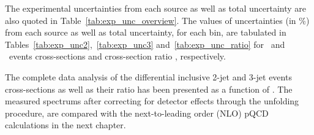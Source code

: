 The experimental uncertainties from each source as well as total uncertainty are also quoted in Table~\ref{tab:exp_unc_overview}. The values of uncertainties (in \%) from each source as well as total uncertainty, for each \httwo bin, are tabulated in Tables~\ref{tab:exp_unc2},~\ref{tab:exp_unc3} and~\ref{tab:exp_unc_ratio} for \njt~and \njth~events cross-sections and cross-section ratio \rations, respectively. 

The complete data analysis of the differential inclusive 2-jet and 3-jet events cross-sections as well as their ratio \ratio has been presented as a function of \httwo. The measured spectrums after correcting for detector effects through the unfolding procedure, are compared with the next-to-leading order (NLO) pQCD calculations in the next chapter. 
